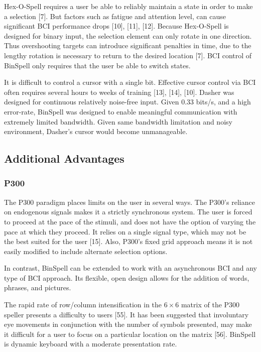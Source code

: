 \documentclass[12pt,titlepage]{article}
\begin{document}
Hex-O-Spell requires a user be able to reliably maintain a state in order to make a selection [7]. 
But factors such as fatigue and attention level, can cause significant BCI performance 
drops [10], [11], [12].  Because Hex-O-Spell is designed for binary input, the selection element 
can only rotate in one direction.  Thus overshooting targets can introduce significant penalties 
in time, due to the  lengthy rotation is necessary to return to the desired location [7].  BCI 
control of BinSpell only requires that the user be able to switch states.

It is difficult to control a cursor with a single bit.  Effective cursor control via BCI often 
requires several hours to weeks of training [13], [14], [10].  Dasher was designed for continuous
relatively noise-free input.  Given $0.33$ bits/s, and a high error-rate,  BinSpell was designed to 
enable meaningful communication with extremely limited bandwidth.  Given same bandwidth 
limitation and noisy environment, Dasher's cursor would become unmanageable.

\subsection{Additional Advantages}

\subsubsection{P300}

The P300 paradigm places limits on the user in several ways.  The P300's reliance on 
endogenous signals makes it a strictly synchronous system.  The user is forced to proceed at the 
pace of the stimuli, and does not have the option of varying the pace at which they proceed.  It 
relies on a single signal type, which may not be the best suited for the user [15].  Also, P300's 
fixed grid approach means it is not easily modified to include alternate selection options.

In contrast, BinSpell can be extended to work with an asynchronous BCI and any type of BCI 
approach.  Its flexible, open design allows for the addition of words, phrases, and pictures.

The rapid rate of row/column intensification in the $6\times6$ matrix of the P300 speller presents a 
difficulty to users [55].  It has been suggested that involuntary eye movements in conjunction with 
the number of symbols presented, may make it difficult for a user to focus on a particular 
location on the matrix [56].  BinSpell is dynamic keyboard with a moderate presentation rate.
\end{document}
